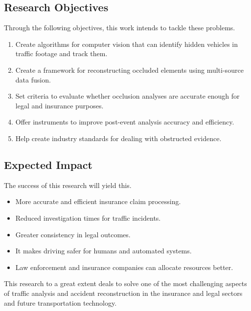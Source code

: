 \documentclass[12pt,a4paper]{report}
\theoremstyle{definition}
\theoremstyle{remark}
\begin{document}
\subsection{Research Objectives}
Through the following objectives, this work intends to tackle these problems.
\begin{enumerate}
    \item Create algorithms for computer vision that can identify hidden vehicles in traffic footage and track them.
    \item Create a framework for reconstructing occluded elements using multi-source data fusion.
    \item Set criteria to evaluate whether occlusion analyses are accurate enough for legal and insurance purposes.
    \item Offer instruments to improve post-event analysis accuracy and efficiency.
    \item Help create industry standards for dealing with obstructed evidence. 
\end{enumerate}

\subsection{Expected Impact}
The success of this research will yield this.
\begin{itemize}
    \item More accurate and efficient insurance claim processing.
    \item Reduced investigation times for traffic incidents.
    \item Greater consistency in legal outcomes.
    \item It makes driving safer for humans and automated systems.
    \item Law enforcement and insurance companies can allocate resources better. 
\end{itemize}
This research to a great extent deals to solve one of the most challenging aspects of traffic analysis and accident reconstruction in the insurance and legal sectors and future transportation technology.
\end{document}
